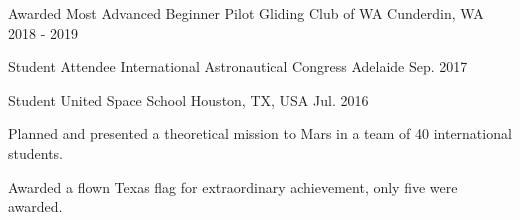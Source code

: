 \begin{cventries}
  \cventry
    {Awarded Most Advanced Beginner Pilot} %
    {Gliding Club of WA} %
    {Cunderdin, WA} %
    {2018 - 2019} %
    {}

  \cventry
    {Student Attendee} %
    {International Astronautical Congress} %
    {Adelaide} %
    {Sep. 2017} %
    {}

  \cventry
    {Student} %
    {United Space School} %
    {Houston, TX, USA} %
    {Jul. 2016} %
    {
      \begin{cvitems} %
        \item {Planned and presented a theoretical mission to Mars in a team of 40 international students.}
        \item {Awarded a flown Texas flag for extraordinary achievement, only five were awarded.}
      \end{cvitems}
    }

\end{cventries}
